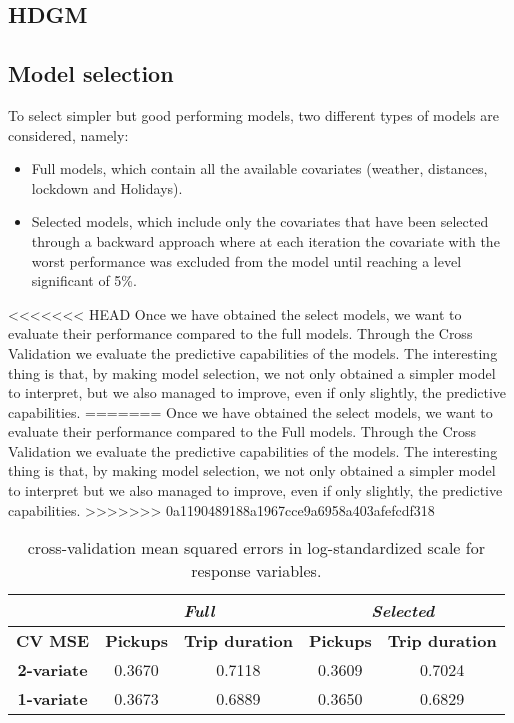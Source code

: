 \subsection{HDGM}
\subsection{Model selection} 
To select simpler but good performing models, two different types of models are considered, namely:
\begin{itemize}
	\item Full models, which contain all the available covariates (weather, distances, lockdown and Holidays).
	\item Selected models, which include only the covariates that have been selected through a backward approach where at each iteration the covariate with the worst performance was excluded from the model until reaching a level significant of \num{5}\%.
\end{itemize}
<<<<<<< HEAD
Once we have obtained the select models, we want to evaluate their performance compared to the full models. Through the Cross Validation we evaluate the predictive capabilities of the models. The interesting thing is that, by making model selection, we not only obtained a simpler model to interpret, but we also managed to improve, even if only slightly, the predictive capabilities. 
=======
Once we have obtained the select models, we want to evaluate their performance compared to the Full models. Through the Cross Validation we evaluate the predictive capabilities of the models. The interesting thing is that, by making model selection, we not only obtained a simpler model to interpret but we also managed to improve, even if only slightly, the predictive capabilities. 
>>>>>>> 0a1190489188a1967cce9a6958a403afefcdf318
\begin{table}[h!]
	\centering
	\renewcommand\arraystretch{1.3}
	\begin{tabular}{c|cc|cc}
		\hline
		\multicolumn{1}{l|}{} & \multicolumn{2}{c|}{\textit{Full}} & \multicolumn{2}{c}{\textit{Selected} }\\ 
		\hline
		\textbf{CV MSE} & \multicolumn{1}{c|}{\textbf{Pickups }} & \textbf{Trip duration} & \multicolumn{1}{c|}{\textbf{Pickups}} & \textbf{Trip duration} \\ 
		\hline
		\textbf{2-variate } & \multicolumn{1}{c|}{0.3670}  & 0.7118   & \multicolumn{1}{c|}{0.3609}  & 0.7024   \\ 
		\hline
		\textbf{1-variate } & \multicolumn{1}{c|}{0.3673}  & 0.6889   & \multicolumn{1}{c|}{0.3650}  & 0.6829   \\ 
		\hline
	\end{tabular}
	\caption[Cross-validation mean squared errors in log-standardized scale for response variables (HDGM)]{cross-validation mean squared errors in log-standardized scale for response variables.}
	\label{Cross-validation mean squared errors HDGM}
\end{table}


